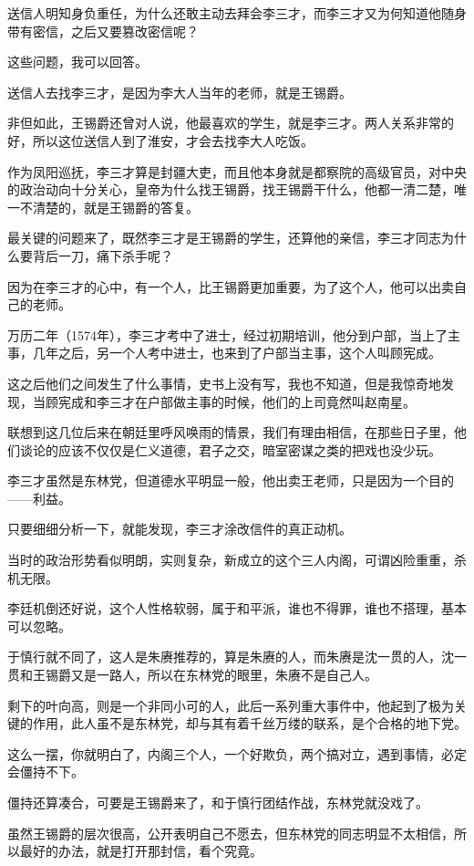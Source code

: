 \begin{multicols}{\theparacolNo}
		送信人明知身负重任，为什么还敢主动去拜会李三才，而李三才又为何知道他随身带有密信，之后又要篡改密信呢？

		这些问题，我可以回答。

		送信人去找李三才，是因为李大人当年的老师，就是王锡爵。

		非但如此，王锡爵还曾对人说，他最喜欢的学生，就是李三才。两人关系非常的好，所以这位送信人到了淮安，才会去找李大人吃饭。

		作为凤阳巡抚，李三才算是封疆大吏，而且他本身就是都察院的高级官员，对中央的政治动向十分关心，皇帝为什么找王锡爵，找王锡爵干什么，他都一清二楚，唯一不清楚的，就是王锡爵的答复。

		最关键的问题来了，既然李三才是王锡爵的学生，还算他的亲信，李三才同志为什么要背后一刀，痛下杀手呢？

		因为在李三才的心中，有一个人，比王锡爵更加重要，为了这个人，他可以出卖自己的老师。

		万历二年（1574年），李三才考中了进士，经过初期培训，他分到户部，当上了主事，几年之后，另一个人考中进士，也来到了户部当主事，这个人叫顾宪成。

		这之后他们之间发生了什么事情，史书上没有写，我也不知道，但是我惊奇地发现，当顾宪成和李三才在户部做主事的时候，他们的上司竟然叫赵南星。

		联想到这几位后来在朝廷里呼风唤雨的情景，我们有理由相信，在那些日子里，他们谈论的应该不仅仅是仁义道德，君子之交，暗室密谋之类的把戏也没少玩。

		李三才虽然是东林党，但道德水平明显一般，他出卖王老师，只是因为一个目的——利益。

		只要细细分析一下，就能发现，李三才涂改信件的真正动机。

		当时的政治形势看似明朗，实则复杂，新成立的这个三人内阁，可谓凶险重重，杀机无限。

		李廷机倒还好说，这个人性格软弱，属于和平派，谁也不得罪，谁也不搭理，基本可以忽略。

		于慎行就不同了，这人是朱赓推荐的，算是朱赓的人，而朱赓是沈一贯的人，沈一贯和王锡爵又是一路人，所以在东林党的眼里，朱赓不是自己人。

		剩下的叶向高，则是一个非同小可的人，此后一系列重大事件中，他起到了极为关键的作用，此人虽不是东林党，却与其有着千丝万缕的联系，是个合格的地下党。

		这么一摆，你就明白了，内阁三个人，一个好欺负，两个搞对立，遇到事情，必定会僵持不下。

		僵持还算凑合，可要是王锡爵来了，和于慎行团结作战，东林党就没戏了。

		虽然王锡爵的层次很高，公开表明自己不愿去，但东林党的同志明显不太相信，所以最好的办法，就是打开那封信，看个究竟。


\end{multicols}
